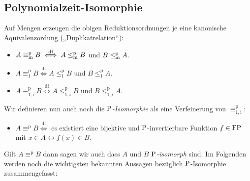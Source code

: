 % 


\subsection*{Polynomialzeit-Isomorphie}
Auf Mengen erzeugen die obigen Reduktionsordnungen je eine kanonische Äquivalenzordung („Duplikatrelation“):
\begin{itemize}
\item $A\equiv_\mathrm{m}^\mathrm{p} B \stackrel{\text{df}}{\iff} A\leqmp B$ und $B\leqmp A$.
\item $A\equiv_\mathrm{1}^\mathrm{p} B \stackrel{\text{df}}{\iff} A\leq_1^\mathrm{p} B$ und $B\leq_1^\mathrm{p} A$.
\item $A\equiv_\mathrm{1,i}^\mathrm{p} B \stackrel{\text{df}}{\iff} A\leq_{1,i}^\mathrm{p} B$ und $B\leq_{1,i}^\mathrm{p} A$.
\end{itemize}
Wir definieren nun auch noch die \emph{$\P$-Isomorphie} als eine Verfeinerung von $\equiv_\mathrm{1,i}^\mathrm{p}$:
\begin{itemize}
    \item $A\equiv^\mathrm{p} B \stackrel{\text{df}}{\iff}$ es existiert eine bijektive und $\P$-invertierbare Funktion $f\in\FP$ mit $x\in A\leftrightarrow f(x)\in B$.
\end{itemize}
Gilt $A\equiv^\mathrm{p} B$ dann sagen wir auch dass $A$ und $B$ \emph{$\P$-isomorph} sind.
Im Folgenden werden noch die wichtigsten bekannten Aussagen bezüglich $\P$-Isomorphie zusammengefasst:

